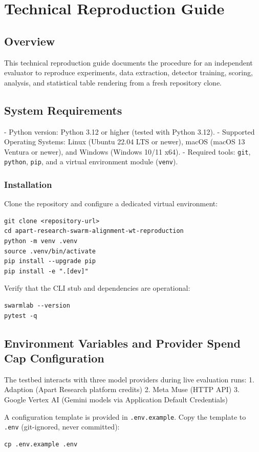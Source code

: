 \documentclass[11pt,a4paper]{article}
\begin{document}
\section{Technical Reproduction Guide}

\subsection{Overview}
This technical reproduction guide documents the procedure for an independent evaluator to reproduce experiments, data extraction, detector training, scoring, analysis, and statistical table rendering from a fresh repository clone.

\subsection{System Requirements}
- Python version: Python 3.12 or higher (tested with Python 3.12).
- Supported Operating Systems: Linux (Ubuntu 22.04 LTS or newer), macOS (macOS 13 Ventura or newer), and Windows (Windows 10/11 x64).
- Required tools: \texttt{git}, \texttt{python}, \texttt{pip}, and a virtual environment module (\texttt{venv}).

\subsubsection{Installation}
Clone the repository and configure a dedicated virtual environment:
\begin{verbatim}
git clone <repository-url>
cd apart-research-swarm-alignment-wt-reproduction
python -m venv .venv
source .venv/bin/activate
pip install --upgrade pip
pip install -e ".[dev]"
\end{verbatim}

Verify that the CLI stub and dependencies are operational:
\begin{verbatim}
swarmlab --version
pytest -q
\end{verbatim}

\subsection{Environment Variables and Provider Spend Cap Configuration}
The testbed interacts with three model providers during live evaluation runs:
1. Adaption (Apart Research platform credits)
2. Meta Muse (HTTP API)
3. Google Vertex AI (Gemini models via Application Default Credentials)

A configuration template is provided in \texttt{.env.example}. Copy the template to \texttt{.env} (git-ignored, never committed):
\begin{verbatim}
cp .env.example .env
\end{verbatim}
\end{document}
